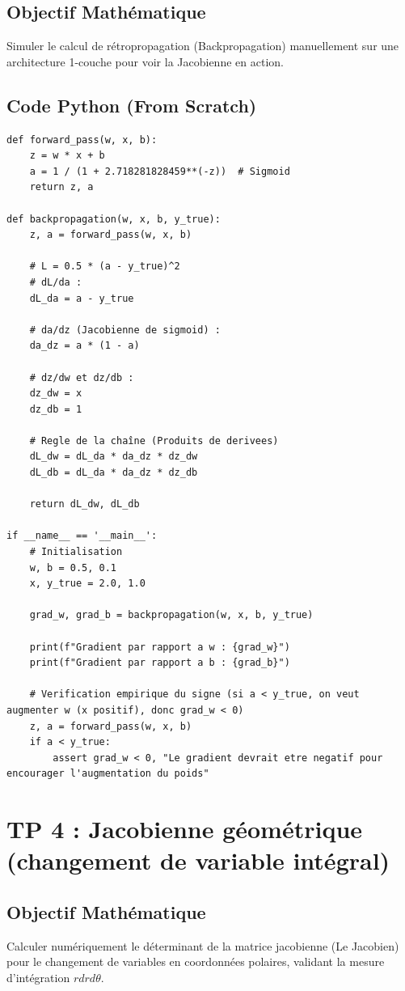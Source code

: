 \documentclass[11pt,a4paper]{article}
\begin{document}
\subsection*{Objectif Mathématique}
Simuler le calcul de rétropropagation (Backpropagation) manuellement sur une architecture 1-couche pour voir la Jacobienne en action.

\subsection*{Code Python (From Scratch)}

\begin{lstlisting}
def forward_pass(w, x, b):
    z = w * x + b
    a = 1 / (1 + 2.718281828459**(-z))  # Sigmoid
    return z, a

def backpropagation(w, x, b, y_true):
    z, a = forward_pass(w, x, b)

    # L = 0.5 * (a - y_true)^2
    # dL/da :
    dL_da = a - y_true

    # da/dz (Jacobienne de sigmoid) :
    da_dz = a * (1 - a)

    # dz/dw et dz/db :
    dz_dw = x
    dz_db = 1

    # Regle de la chaîne (Produits de derivees)
    dL_dw = dL_da * da_dz * dz_dw
    dL_db = dL_da * da_dz * dz_db

    return dL_dw, dL_db

if __name__ == '__main__':
    # Initialisation
    w, b = 0.5, 0.1
    x, y_true = 2.0, 1.0

    grad_w, grad_b = backpropagation(w, x, b, y_true)

    print(f"Gradient par rapport a w : {grad_w}")
    print(f"Gradient par rapport a b : {grad_b}")

    # Verification empirique du signe (si a < y_true, on veut augmenter w (x positif), donc grad_w < 0)
    z, a = forward_pass(w, x, b)
    if a < y_true:
        assert grad_w < 0, "Le gradient devrait etre negatif pour encourager l'augmentation du poids"
\end{lstlisting}

\newpage
\section*{TP 4 : Jacobienne géométrique (changement de variable intégral)}

\subsection*{Objectif Mathématique}
Calculer numériquement le déterminant de la matrice jacobienne (Le Jacobien) pour le changement de variables en coordonnées polaires, validant la mesure d'intégration $r dr d\theta$.
\end{document}
